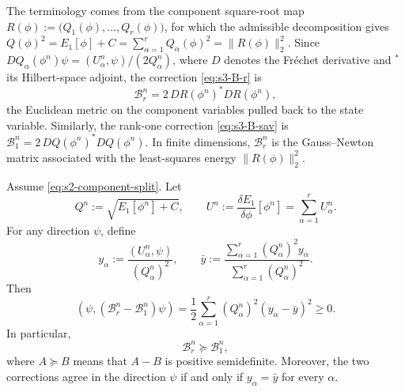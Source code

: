 \documentclass[10pt,onefignum,onetabnum,hidelinks]{siamart251216}
\begin{document}
\begin{remark}
\label{rem:pullback}
The terminology comes from the component square-root map
\(R(\phi):=\bigl(Q_1(\phi),\dots,Q_r(\phi)\bigr)\),
for which the admissible decomposition gives
\(Q(\phi)^2=E_1[\phi]+C=\sum_{\alpha=1}^r Q_\alpha(\phi)^2=\|R(\phi)\|_2^2\).
Since \(DQ_\alpha(\phi^n)\psi=(U_\alpha^n,\psi)/(2Q_\alpha^n)\), where
\(D\) denotes the Fr\'echet derivative and \(^{*}\) its Hilbert-space adjoint, the correction
\eqref{eq:s3-B-r} is
\[
\mathcal B_r^n=2\,DR(\phi^n)^*DR(\phi^n),
\]
the Euclidean metric on the component variables pulled back to the state variable.
Similarly, the rank-one correction \eqref{eq:s3-B-sav} is
\(\mathcal B_1^n=2\,DQ(\phi^n)^*DQ(\phi^n)\). In finite dimensions,
\(\mathcal B_r^n\) is the Gauss--Newton matrix associated with the least-squares
energy \(\|R(\phi)\|_2^2\).
\end{remark}

\begin{lemma}
\label{lem:B-ordering}
\label{lem:weighted-variance-gap}
Assume \eqref{eq:s2-component-split}. Let
\[
Q^n:=\sqrt{E_1[\phi^n]+C},
\qquad
U^n:=\frac{\delta E_1}{\delta\phi}[\phi^n]
=\sum_{\alpha=1}^r U_\alpha^n .
\]
For any direction \(\psi\), define
\[
y_\alpha
:=
\frac{(U_\alpha^n,\psi)}{(Q_\alpha^n)^2},
\qquad
\bar y
:=
\frac{\sum_{\alpha=1}^r (Q_\alpha^n)^2 y_\alpha}
{\sum_{\alpha=1}^r (Q_\alpha^n)^2}.
\]
Then
\begin{equation}
\left(\psi,(\mathcal B_r^n-\mathcal B_1^n)\psi\right)
=
\frac12
\sum_{\alpha=1}^r
(Q_\alpha^n)^2
\left(y_\alpha-\bar y\right)^2
\ge 0 .
\label{eq:s3-weighted-variance-gap}
\end{equation}
In particular,
\[
\mathcal B_r^n\succeq\mathcal B_1^n,
\]
where \(A\succeq B\) means that \(A-B\) is positive semidefinite. Moreover, the
two corrections agree in the direction \(\psi\) if and only if
\(y_\alpha=\bar y\) for every \(\alpha\).
\end{lemma}
\end{document}
